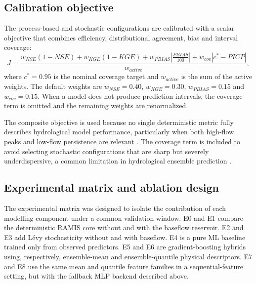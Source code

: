 \documentclass[a4paper,fleqn]{cas-sc}
\begin{document}
\subsection{Calibration objective}\label{subsec:calibration}

The process-based and stochastic configurations are calibrated with a
scalar objective that combines efficiency, distributional agreement,
bias and interval coverage:
\begin{equation}
J = \frac{w_{NSE}(1-NSE) + w_{KGE}(1-KGE)
  + w_{PBIAS}\left|\frac{PBIAS}{100}\right|
  + w_{cov}|c^*-PICP|}{w_{active}},
\label{eq:objective}
\end{equation}
where $c^*=0.95$ is the nominal coverage target and $w_{active}$ is the
sum of the active weights. The default weights are $w_{NSE}=0.40$,
$w_{KGE}=0.30$, $w_{PBIAS}=0.15$ and $w_{cov}=0.15$. When a model does
not produce prediction intervals, the coverage term is omitted and the
remaining weights are renormalized.

The composite objective is used because no single deterministic metric
fully describes hydrological model performance, particularly when both
high-flow peaks and low-flow persistence are relevant
\citep{pushpalatha2012review}. The coverage term is included to avoid
selecting stochastic configurations that are sharp but severely
underdispersive, a common limitation in hydrological ensemble
prediction \citep{franz2011evaluating,abaza2017incidence}.

\subsection{Experimental matrix and ablation design}\label{subsec:matrix}

The experimental matrix was designed to isolate the contribution of each
modelling component under a common validation window. E0 and E1 compare
the deterministic RAMIS core without and with the baseflow reservoir.
E2 and E3 add L\'{e}vy stochasticity without and with baseflow. E4 is a
pure ML baseline trained only from observed predictors. E5 and E6 are
gradient-boosting hybrids using, respectively, ensemble-mean and
ensemble-quantile physical descriptors. E7 and E8 use the same mean and
quantile feature families in a sequential-feature setting, but with the
fallback MLP backend described above.
\end{document}
